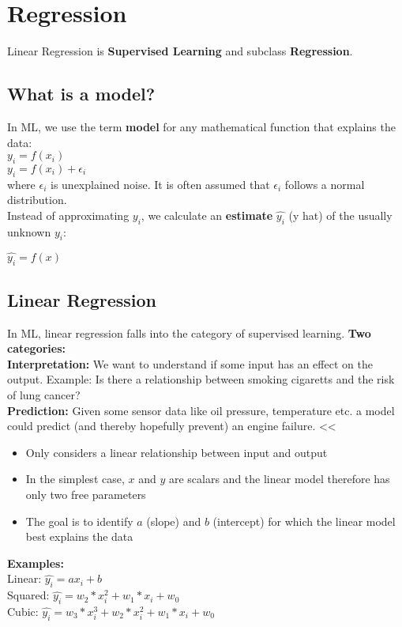 \section{Regression}
Linear Regression is \textbf{Supervised Learning} and subclass \textbf{Regression}.
\subsection{What is a model?}
In ML, we use the term \textbf{model} for any mathematical function that explains the data:\\
$y_i = f(x_i)$\\
$y_i = f(x_i) + \epsilon_i$\\
where $\epsilon_i$ is unexplained noise. It is often assumed that $\epsilon_i$ follows a normal distribution.\\
Instead of approximating $y_i$, we calculate an \textbf{estimate} $\hat{y_i}$ (y hat) of the usually unknown $y_i$: \\
\begin{center}
    $\hat{y_i} = f(x)$
\end{center}

\subsection{Linear Regression}
In ML, linear regression falls into the category of supervised learning.
\textbf{Two categories:}\\
\textbf{Interpretation:} We want to understand if some input has an effect on the output. Example: Is there a
relationship between smoking cigaretts and the risk of lung cancer?\\
\textbf{Prediction:} Given some sensor data like oil pressure, temperature etc. a model could predict (and thereby
hopefully prevent) an engine failure.     <<

\begin{itemize}
    \item Only considers a linear relationship between input and output
    \item In the simplest case, $x$ and $y$ are scalars and the linear model therefore has only two free parameters
    \item The goal is to identify $a$ (slope) and $b$ (intercept) for which the linear model best explains the data
\end{itemize}
\textbf{Examples:}\\
Linear: $\hat{y_i} = ax_i + b$\\
Squared: $\hat{y_i} = w_2 * x_i^2 + w_1 * x_i + w_0$\\
Cubic: $\hat{y_i} = w_3 * x_i^3 + w_2 * x_i^2 + w_1 * x_i + w_0$\\


